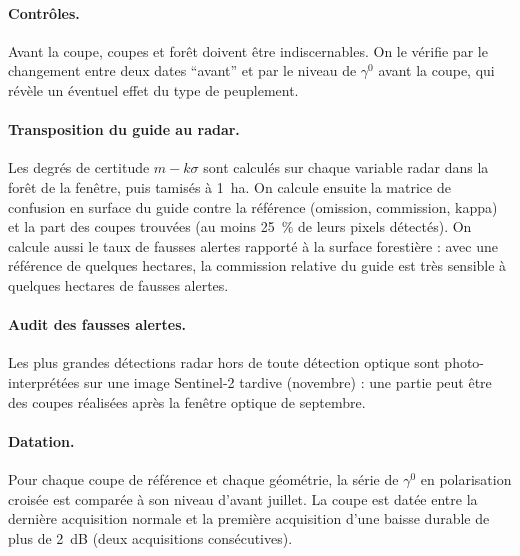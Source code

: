 \paragraph{Contrôles.} Avant la coupe, coupes et forêt doivent être indiscernables. On le vérifie par le
changement entre deux dates \enquote{avant} et par le niveau de $\gamma^0$ avant la coupe, qui révèle un éventuel
effet du type de peuplement.

\paragraph{Transposition du guide au radar.} Les degrés de certitude $m-k\sigma$ sont calculés sur chaque variable
radar dans la forêt de la fenêtre, puis tamisés à 1~ha. On calcule ensuite la matrice de confusion en surface du
guide contre la référence (omission, commission, kappa) et la part des coupes trouvées (au moins 25~\% de leurs
pixels détectés). On calcule aussi le taux de fausses alertes rapporté à la surface forestière : avec une
référence de quelques hectares, la commission relative du guide est très sensible à quelques hectares de fausses
alertes.

\paragraph{Audit des fausses alertes.} Les plus grandes détections radar hors de toute détection optique sont
photo-interprétées sur une image Sentinel-2 tardive (novembre) : une partie peut être des coupes réalisées après
la fenêtre optique de septembre.

\paragraph{Datation.} Pour chaque coupe de référence et chaque géométrie, la série de $\gamma^0$ en polarisation
croisée est comparée à son niveau d'avant juillet. La coupe est datée entre la dernière acquisition normale et la
première acquisition d'une baisse durable de plus de 2~dB (deux acquisitions consécutives).
